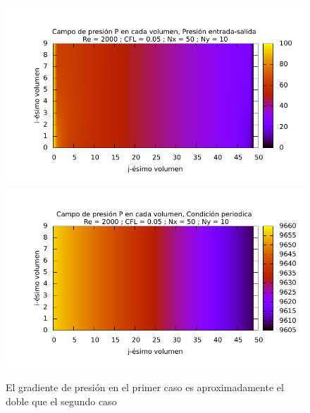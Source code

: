 \begin{figure} [H]
\centering
\includegraphics[width=1\textwidth]{./fig1_1/fig1_1/pressure_field.pdf}
\includegraphics[width=1\textwidth]{./fig1_1/pressure_field.pdf}
\caption{El gradiente de presión en el primer caso es aproximadamente el doble que el segundo caso} \label{fig_2}
\end{figure}

